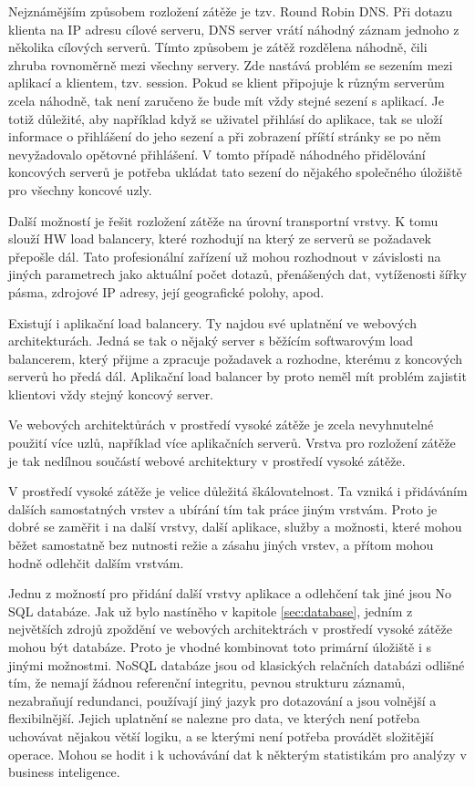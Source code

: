 \documentclass[12pt]{article}
\begin{document}
Nejznámějším způsobem rozložení zátěže je tzv. Round Robin DNS. Při dotazu klienta na IP adresu cílové serveru, DNS server vrátí náhodný záznam jednoho z několika cílových serverů. Tímto způsobem je zátěž rozdělena náhodně, čili zhruba rovnoměrně mezi všechny servery. Zde nastává problém se sezením mezi aplikací a klientem, tzv. session. Pokud se klient připojuje k různým serverům zcela náhodně, tak není zaručeno že bude mít vždy stejné sezení s aplikací. Je totiž důležité, aby například když se uživatel přihlásí do aplikace, tak se uloží informace o přihlášení do jeho sezení a při zobrazení příští stránky se po něm nevyžadovalo opětovné přihlášení. V tomto případě náhodného přidělování koncových serverů je potřeba ukládat tato sezení do nějakého společného úložiště pro všechny koncové uzly.

Další možností je řešit rozložení zátěže na úrovní transportní vrstvy. K tomu slouží HW load balancery, které rozhodují na který ze serverů se požadavek přepošle dál. Tato profesionální zařízení už mohou rozhodnout v závislosti na jiných parametrech jako aktuální počet dotazů, přenášených dat, vytíženosti šířky pásma, zdrojové IP adresy, její geografické polohy, apod. 

Existují i aplikační load balancery. Ty najdou své uplatnění ve webových architekturách. Jedná se tak o nějaký server s běžícím softwarovým load balancerem, který přijme a zpracuje požadavek a rozhodne, kterému z koncových serverů ho předá dál. Aplikační load balancer by proto neměl mít problém zajistit klientovi vždy stejný koncový server.

Ve webových architektůrách v prostředí vysoké zátěže je zcela nevyhnutelné použití více uzlů, například více aplikačních serverů. Vrstva pro rozložení zátěže je tak nedílnou součástí webové architektury v prostředí vysoké zátěže.

\obrazek
{}


V prostředí vysoké zátěže je velice důležitá škálovatelnost. Ta vzniká i přidáváním dalších samostatných vrstev a ubírání tím tak práce jiným vrstvám. Proto je dobré se zaměřit i na další vrstvy, další aplikace, služby a možnosti, které mohou běžet samostatně bez nutnosti režie a zásahu jiných vrstev, a přítom mohou hodně odlehčit dalším vrstvám.

Jednu z možností pro přidání další vrstvy aplikace a odlehčení tak jiné jsou No SQL databáze. Jak už bylo nastíněho v kapitole \ref{sec:database}, jedním z největších zdrojů zpoždění ve webových architektrách v prostředí vysoké zátěže mohou být databáze. Proto je vhodné kombinovat toto primární úložiště i s jinými možnostmi. NoSQL databáze jsou od klasických relačních databázi odlišné tím, že nemají žádnou referenční integritu, pevnou strukturu záznamů, nezabraňují redundanci, používají jiný jazyk pro dotazování a jsou volnější a flexibilnější. Jejich uplatnění se nalezne pro data, ve kterých není potřeba uchovávat nějakou větší logiku, a se kterými není potřeba provádět složitější operace. Mohou se hodit i k uchovávání dat k některým statistikám pro analýzy v business inteligence.
\end{document}
